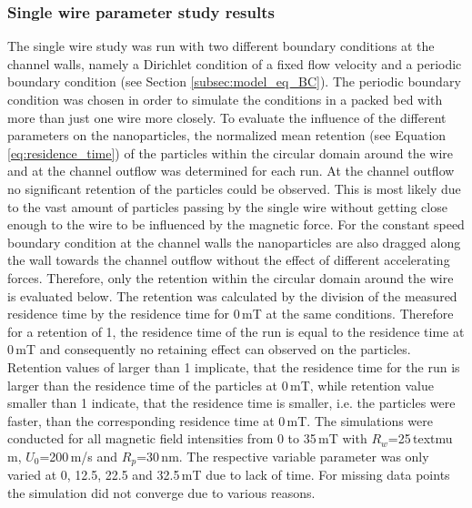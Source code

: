 \subsubsection{Single wire parameter study results}
\label{subsubsec:One_wire}

The single wire study was run with two different boundary conditions at the channel walls, namely a Dirichlet condition of a fixed flow velocity and a periodic boundary condition (see Section \ref{subsec:model_eq_BC}). The periodic boundary condition was chosen in order to simulate the conditions in a packed bed with more than just one wire more closely. To evaluate the influence of the different parameters on the nanoparticles, the normalized mean retention (see Equation\,\ref{eq:residence_time}) of the particles within the circular domain around the wire and at the channel outflow  was determined for each run. At the channel outflow no significant retention of the particles could be observed. This is most likely due to the vast amount of particles passing by the single wire without getting close enough to the wire to be influenced by the magnetic force. For the constant speed boundary condition at the channel walls the nanoparticles are also dragged along the wall towards the channel outflow without the effect of different accelerating forces. Therefore, only the retention within the circular domain around the wire is evaluated below. The retention was calculated by the division of the measured residence time by the residence time for 0\,mT at the same conditions. Therefore for a retention of 1, the residence time of the run is equal to the residence time at 0\,mT and consequently no retaining effect can observed on the particles. Retention values of larger than 1 implicate, that the residence time for the run is larger than the residence time of the particles at 0\,mT, while retention value smaller than 1 indicate, that the residence time is smaller, i.e. the particles were faster, than the corresponding residence time at 0\,mT. The simulations were conducted for all magnetic field intensities from 0 to 35\,mT with $R_{w}$=25\,textmu m, $U_{0}$=200\,\textmu m/s and $R_{p}$=30\,nm. The respective variable parameter was only varied at 0, 12.5, 22.5 and 32.5\,mT due to lack of time. For missing data points the simulation did not converge due to various reasons.
  

